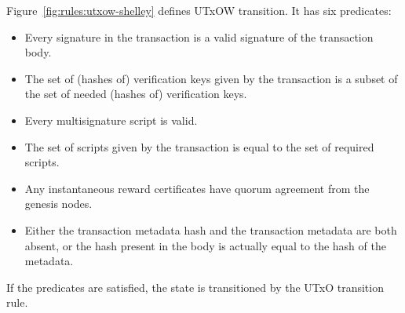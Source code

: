 Figure~\ref{fig:rules:utxow-shelley} defines UTxOW transition.
It has six predicates:
\begin{itemize}
  \item Every signature in the transaction is a valid signature of the transaction body.
  \item The set of (hashes of) verification keys given by the transaction is a subset of
    the set of needed (hashes of) verification keys.
  \item Every multisignature script is valid.
  \item The set of scripts given by the transaction is equal to the set of required scripts.
  \item Any instantaneous reward certificates have quorum agreement from the genesis nodes.
  \item Either the transaction metadata hash and the transaction metadata are both absent,
    or the hash present in the body is actually equal to the hash of the metadata.
\end{itemize}
If the predicates are satisfied, the state is transitioned by the UTxO transition rule.

